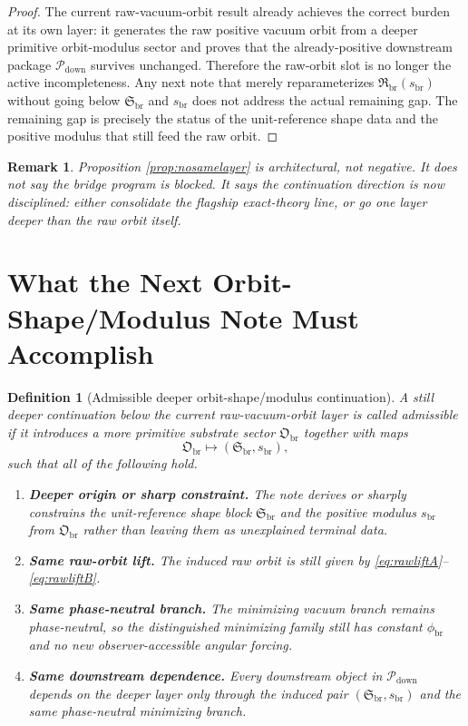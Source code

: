 \documentclass[11pt]{article}
\newcommand{\RespVacPhase}{\phi_{\mathrm{br}}}
\newcommand{\DownPkg}{\mathscr P_{\mathrm{down}}}
\newcommand{\ShapeTuple}{\mathfrak S_{\mathrm{br}}}
\newcommand{\RawTuple}{\mathfrak R_{\mathrm{br}}}
\newcommand{\DeepSector}{\mathfrak O_{\mathrm{br}}}
\newcommand{\ScaleMod}{s_{\mathrm{br}}}
\newtheorem{definition}{Definition}
\newtheorem{remark}{Remark}
\begin{document}
\begin{proof}
The current raw-vacuum-orbit result already achieves the correct burden at its own layer: it generates the raw positive vacuum orbit from a deeper primitive orbit-modulus sector and proves that the already-positive downstream package \(\DownPkg\) survives unchanged. Therefore the raw-orbit slot is no longer the active incompleteness. Any next note that merely reparameterizes \(\RawTuple(\ScaleMod)\) without going below \(\ShapeTuple\) and \(\ScaleMod\) does not address the actual remaining gap. The remaining gap is precisely the status of the unit-reference shape data and the positive modulus that still feed the raw orbit.
\end{proof}

\begin{remark}
Proposition \ref{prop:nosamelayer} is architectural, not negative. It does not say the bridge program is blocked. It says the continuation direction is now disciplined: either consolidate the flagship exact-theory line, or go one layer deeper than the raw orbit itself.
\end{remark}

\section{What the Next Orbit-Shape/Modulus Note Must Accomplish}

\begin{definition}[Admissible deeper orbit-shape/modulus continuation]
\label{def:admissible}
A still deeper continuation below the current raw-vacuum-orbit layer is called \emph{admissible} if it introduces a more primitive substrate sector \(\DeepSector\) together with maps
\begin{equation}
\DeepSector
\longmapsto
(\ShapeTuple,\ScaleMod),
\label{eq:deepermap}
\end{equation}
such that all of the following hold.
\begin{enumerate}
    \item \textbf{Deeper origin or sharp constraint.} The note derives or sharply constrains the unit-reference shape block \(\ShapeTuple\) and the positive modulus \(\ScaleMod\) from \(\DeepSector\) rather than leaving them as unexplained terminal data.
    \item \textbf{Same raw-orbit lift.} The induced raw orbit is still given by \eqref{eq:rawliftA}--\eqref{eq:rawliftB}.
    \item \textbf{Same phase-neutral branch.} The minimizing vacuum branch remains phase-neutral, so the distinguished minimizing family still has constant \(\RespVacPhase\) and no new observer-accessible angular forcing.
    \item \textbf{Same downstream dependence.} Every downstream object in \(\DownPkg\) depends on the deeper layer only through the induced pair \((\ShapeTuple,\ScaleMod)\) and the same phase-neutral minimizing branch.
\end{enumerate}
\end{definition}
\end{document}
